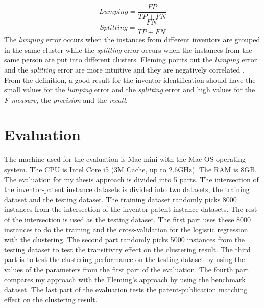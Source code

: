 \begin{equation}
Lumping=\frac{FP}{TP+FN}
\end{equation}
\begin{equation}
Splitting=\frac{FN}{TP+FN}
\end{equation}
The \emph{lumping} error occurs when the instances from different inventors are grouped in the same cluster while the \emph{splitting} error occurs when the instances from the same person are put into different clusters. Fleming points out the \emph{lumping} error and the \emph{splitting} error are more intuitive and they are negatively correlated \cite{RePEc:eee:respol:v:43:y:2014:i:6:p:941-955}. From the definition, a good result for the inventor identification should have the small values for the \emph{lumping} error and the \emph{splitting} error and high values for the \emph{F-measure}, the \emph{precision} and the \emph{recall}.

\section{Evaluation}
The machine used for the evaluation is Mac-mini with the Mac-OS operating system. The CPU is Intel Core i5 (3M Cache, up to 2.6GHz). The RAM is 8GB. The evaluation for my thesis approach is divided into 5 parts. The intersection of the inventor-patent instance datasets is divided into two datasets, the training dataset and the testing dataset. The training dataset randomly picks 8000 instances from the intersection of the inventor-patent instance datasets. The rest of the intersection is used as the testing dataset. The first part uses these 8000 instances to do the training and the cross-validation for the logistic regression with the clustering. The second part randomly picks 5000 instances from the testing dataset to test the transitivity effect on the clustering result. The third part is to test the clustering performance on the testing dataset by using the values of the parameters from the first part of the evaluation. The fourth part compares my approach with the Fleming's approach by using the benchmark dataset. The last part of the evaluation tests the patent-publication matching effect on the clustering result.

